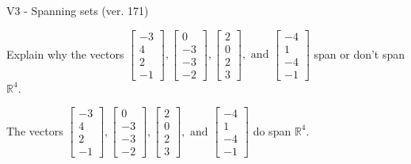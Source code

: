 \begin{exercise}
  \begin{exerciseTitle}V3 - Spanning sets (ver. 171)\end{exerciseTitle}
  \begin{exerciseStatement}
    Explain why the vectors \(\left[\begin{array}{r}
-3 \\
4 \\
2 \\
-1
\end{array}\right] , \left[\begin{array}{r}
0 \\
-3 \\
-3 \\
-2
\end{array}\right] , \left[\begin{array}{r}
2 \\
0 \\
2 \\
3
\end{array}\right] , \text{ and } \left[\begin{array}{r}
-4 \\
1 \\
-4 \\
-1
\end{array}\right]\) span or don't span \(\mathbb{R}^4\). 
	


  \end{exerciseStatement}
  \begin{exerciseAnswer}
   The vectors \(\left[\begin{array}{r}
-3 \\
4 \\
2 \\
-1
\end{array}\right] , \left[\begin{array}{r}
0 \\
-3 \\
-3 \\
-2
\end{array}\right] , \left[\begin{array}{r}
2 \\
0 \\
2 \\
3
\end{array}\right] , \text{ and } \left[\begin{array}{r}
-4 \\
1 \\
-4 \\
-1
\end{array}\right]\) 
  	 do  
	span \(\mathbb{R}^4\).
  


  \end{exerciseAnswer}
\end{exercise}